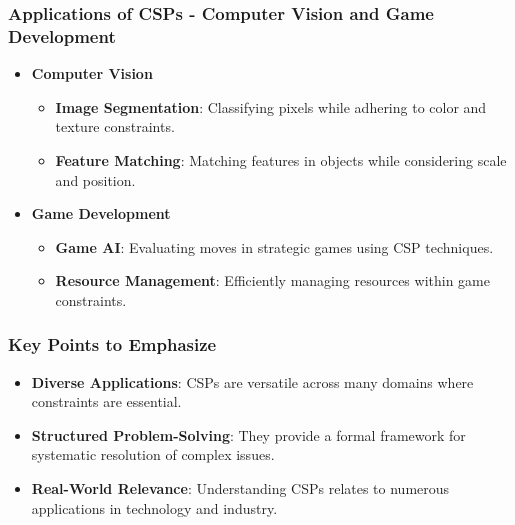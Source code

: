 \documentclass[aspectratio=169]{beamer}
\begin{document}
\begin{frame}[fragile]
    \frametitle{Applications of CSPs - Computer Vision and Game Development}
    \begin{itemize}
        \item \textbf{Computer Vision}
        \begin{itemize}
            \item \textbf{Image Segmentation}: Classifying pixels while adhering to color and texture constraints.
            \item \textbf{Feature Matching}: Matching features in objects while considering scale and position.
        \end{itemize}
        \item \textbf{Game Development}
        \begin{itemize}
            \item \textbf{Game AI}: Evaluating moves in strategic games using CSP techniques.
            \item \textbf{Resource Management}: Efficiently managing resources within game constraints.
        \end{itemize}
    \end{itemize}
\end{frame}

\begin{frame}[fragile]
    \frametitle{Key Points to Emphasize}
    \begin{itemize}
        \item \textbf{Diverse Applications}: CSPs are versatile across many domains where constraints are essential.
        \item \textbf{Structured Problem-Solving}: They provide a formal framework for systematic resolution of complex issues.
        \item \textbf{Real-World Relevance}: Understanding CSPs relates to numerous applications in technology and industry.
    \end{itemize}
\end{frame}
\end{document}
